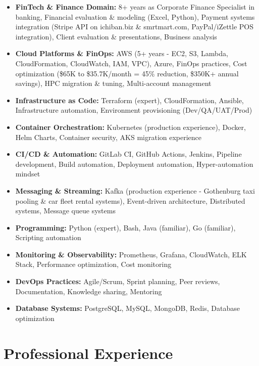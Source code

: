 \documentclass[11pt,a4paper]{article}
\begin{document}
\begin{itemize}[leftmargin=*, itemsep=2pt]
\item \textbf{FinTech \& Finance Domain:} 8+ years as Corporate Finance Specialist in banking, Financial evaluation \& modeling (Excel, Python), Payment systems integration (Stripe API on ichiban.biz \& smrtmart.com, PayPal/iZettle POS integration), Client evaluation \& presentations, Business analysis
\item \textbf{Cloud Platforms \& FinOps:} AWS (5+ years - EC2, S3, Lambda, CloudFormation, CloudWatch, IAM, VPC), Azure, FinOps practices, Cost optimization (\$65K to \$35.7K/month = 45\% reduction, \$350K+ annual savings), HPC migration \& tuning, Multi-account management
\item \textbf{Infrastructure as Code:} Terraform (expert), CloudFormation, Ansible, Infrastructure automation, Environment provisioning (Dev/QA/UAT/Prod)
\item \textbf{Container Orchestration:} Kubernetes (production experience), Docker, Helm Charts, Container security, AKS migration experience
\item \textbf{CI/CD \& Automation:} GitLab CI, GitHub Actions, Jenkins, Pipeline development, Build automation, Deployment automation, Hyper-automation mindset
\item \textbf{Messaging \& Streaming:} Kafka (production experience - Gothenburg taxi pooling \& car fleet rental systems), Event-driven architecture, Distributed systems, Message queue systems
\item \textbf{Programming:} Python (expert), Bash, Java (familiar), Go (familiar), Scripting automation
\item \textbf{Monitoring \& Observability:} Prometheus, Grafana, CloudWatch, ELK Stack, Performance optimization, Cost monitoring
\item \textbf{DevOps Practices:} Agile/Scrum, Sprint planning, Peer reviews, Documentation, Knowledge sharing, Mentoring
\item \textbf{Database Systems:} PostgreSQL, MySQL, MongoDB, Redis, Database optimization
\end{itemize}


\section*{Professional Experience}
\end{document}
